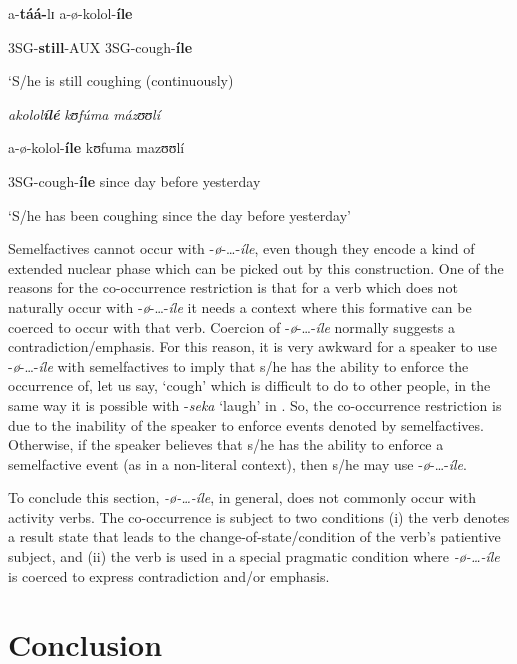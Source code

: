 \documentclass[output=paper,newtxmath,modfonts,nonflat,draftmode]{langsci/langscibook}
\begin{document}
      a-\textbf{táá-}lɪ            a-ø-kolol-\textbf{íle}

      3SG-\textbf{still}-AUX 3SG-cough-\textbf{íle}

      ‘S/he is still coughing (continuously)



\ex  *\textit{akolol}\textbf{\textit{ílé} }         \textit{kʊ}\textit{fúma} \textit{mázʊʊ}\textit{lí}

      a-ø-kolol-\textbf{íle}    kʊfuma mazʊʊlí

      3SG-cough-\textbf{íle} since     day before yesterday

      
    ‘S/he has been coughing since the day before yesterday’
\z
\z


  Semelfactives cannot occur with -\textit{ø}-…-\textit{íle}, even though they encode a kind of extended nuclear phase which can be picked out by this construction. One of the reasons for the co-occurrence restriction is that for a verb which does not naturally occur with -\textit{ø}-…-\textit{íle} it needs a context where this formative can be coerced to occur with that verb. Coercion of -\textit{ø}-…-\textit{íle} normally suggests a contradiction/emphasis. For this reason, it is very awkward for a speaker to use -\textit{ø}-…-\textit{íle} with semelfactives to imply that s/he has the ability to enforce the occurrence of, let us say, ‘cough’ which is difficult to do to other people, in the same way it is possible with -\textit{seka} ‘laugh’ in . So, the co-occurrence restriction is due to the inability of the speaker to enforce events denoted by semelfactives. Otherwise, if the speaker believes that s/he has the ability to enforce a semelfactive event (as in a non-literal context), then s/he may use -\textit{ø}-…-\textit{íle}. 


To conclude this section, \textit{-ø}\textit{-…-íle}, in general, does not commonly occur with activity verbs. The co-occurrence is subject to two conditions (i) the verb denotes a result state that leads to the change-of-state/condition of the verb’s patientive subject, and (ii) the verb is used in a special pragmatic condition where \textit{-ø}\textit{-…-íle} is coerced to express contradiction and/or emphasis.

\section{Conclusion}

\label{sec:kanijo:5}
\end{document}
